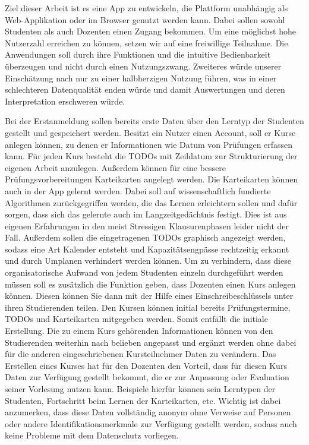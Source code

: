 Ziel dieser Arbeit ist es eine App zu entwickeln, die Plattform unabhängig als Web-Applikation oder im Browser genutzt werden kann. Dabei sollen sowohl Studenten als auch Dozenten einen Zugang bekommen. Um eine möglichst hohe Nutzerzahl erreichen zu können, setzen wir auf eine freiwillige Teilnahme. Die Anwendungen soll durch ihre Funktionen und die intuitive Bedienbarkeit überzeugen und nicht durch einen Nutzungszwang. Zweiteres würde unserer Einschätzung nach nur zu einer halbherzigen Nutzung führen, was in einer schlechteren Datenqualität enden würde und damit Auswertungen und deren Interpretation erschweren würde. 

Bei der Erstanmeldung sollen bereits erste Daten über den Lerntyp der Studenten gestellt und gespeichert werden. Besitzt ein Nutzer einen Account, soll er Kurse anlegen können, zu denen er Informationen wie Datum von Prüfungen erfassen kann. Für jeden Kurs besteht die TODOs mit Zeildatum zur Strukturierung der eigenen Arbeit anzulegen. Außerdem können für eine bessere Prüfungsvorbereitungen Karteikarten angelegt werden. Die Karteikarten können auch in der App gelernt werden. Dabei soll auf wissenschaftlich fundierte Algorithmen zurückgegriffen werden, die das Lernen erleichtern sollen und dafür sorgen, dass sich das gelernte auch im Langzeitgedächtnis festigt. Dies ist aus eigenen Erfahrungen in den meist Stressigen Klausurenphasen leider nicht der Fall. Außerdem sollen die eingetragenen TODOs graphisch angezeigt werden, sodass eine Art Kalender entsteht und Kapazitätsengpässe rechtzeitig erkannt und durch Umplanen verhindert werden können. Um zu verhindern, dass diese organisatorische Aufwand von jedem Studenten einzeln durchgeführt werden müssen soll es zusätzlich die Funktion geben, dass Dozenten einen Kurs anlegen können. Diesen können Sie dann mit der Hilfe eines Einschreibeschlüssels unter ihren Studierenden teilen. Den Kursen können initial bereits Prüfungstermine, TODOs und Karteikarten mitgegeben werden. Somit entfällt die initiale Erstellung. Die zu einem Kurs gehörenden Informationen können von den Studierenden weiterhin nach belieben angepasst und ergänzt werden ohne dabei für die anderen eingeschriebenen Kursteilnehmer Daten zu verändern. Das Erstellen eines Kurses hat für den Dozenten den Vorteil, dass für diesen Kurs Daten zur Verfügung gestellt bekommt, die er zur Anpassung oder Evaluation seiner Vorlesung nutzen kann. Beispiele hierfür können sein Lerntypen der Studenten, Fortschritt beim Lernen der Karteikarten, etc. Wichtig ist dabei anzumerken, dass diese Daten vollständig anonym ohne Verweise auf Personen oder andere Identifikationsmerkmale zur Verfügung gestellt werden, sodass auch keine Probleme mit dem Datenschutz vorliegen. 

